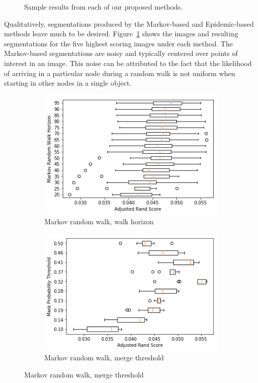\documentclass[twocolumn]{article}
\newcommand{\figref}[1]{Figure~\ref{fig:#1}}
\newcommand{\figlab}[1]{\label{fig:#1}}
\begin{document}
\begin{figure}[t!]
\caption{Sample results from each of our proposed methods.}
\figlab{sample_results}
\end{figure}

Qualitatively, segmentations produced by the Markov-based and Epidemic-based
methods leave much to be desired. \figref{sample_results} shows the images and
resulting segmentations for the five highest scoring images under each method.
The Markov-based segmentations are noisy and typically centered over points of
interest in an image. This noise can be attributed to the fact that the
likelihood of arriving in a particular node during a random walk is not uniform
when starting in other nodes in a single object. 

\begin{figure}[t!]
  \centering

  \begin{subfigure}{0.49\linewidth}
    \includegraphics[width=\linewidth]{figs/markov_horizon.png}
    \caption{Markov random walk, walk horizon}
  \end{subfigure}
  \begin{subfigure}{0.49\linewidth}
    \includegraphics[width=\linewidth]{figs/markov_thresh.png}
    \caption{Markov random walk, merge threshold}
  \end{subfigure}


\end{figure}
\end{document}

